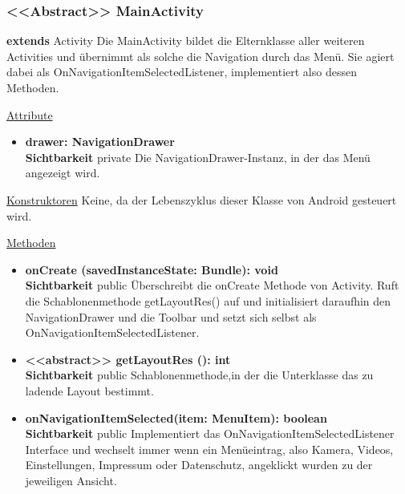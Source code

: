 \subsubsection{<<Abstract>> MainActivity} \label{app:klasse:MainActivity}
\textbf{extends} Activity \newline
Die MainActivity bildet die Elternklasse aller weiteren Activities und übernimmt als solche die Navigation durch das Menü. Sie agiert dabei als OnNavigationItemSelectedListener, implementiert also dessen Methoden.
\newline

\underline{Attribute}
\begin{itemize}
\itemsep0pt
\item \textbf{drawer: NavigationDrawer} \hfill\\ 
\textbf{Sichtbarkeit} private\newline
Die NavigationDrawer-Instanz, in der das Menü angezeigt wird.

\end{itemize}

\underline{Konstruktoren}\newline
\indent Keine, da der Lebenszyklus dieser Klasse von Android gesteuert wird.\newline

\underline{Methoden}
\begin{itemize}
\itemsep0pt

\item \textbf{onCreate (savedInstanceState: Bundle): void}\hfill\\
\textbf{Sichtbarkeit} public\newline
Überschreibt die onCreate Methode von Activity. Ruft die Schablonenmethode getLayoutRes() auf und initialisiert daraufhin den NavigationDrawer und die Toolbar und setzt sich selbst als OnNavigationItemSelectedListener.

\item \textbf{ <<abstract>> getLayoutRes (): int}\hfill\\
\textbf{Sichtbarkeit} public\newline
Schablonenmethode,in der die Unterklasse das zu ladende Layout bestimmt.

\item \textbf{onNavigationItemSelected(item: MenuItem): boolean}\hfill\\
\textbf{Sichtbarkeit} public\newline
Implementiert das OnNavigationItemSelectedListener Interface und wechselt immer wenn ein Menüeintrag, also Kamera, Videos, Einstellungen, Impressum oder Datenschutz, angeklickt wurden zu der jeweiligen Ansicht.

\end{itemize}